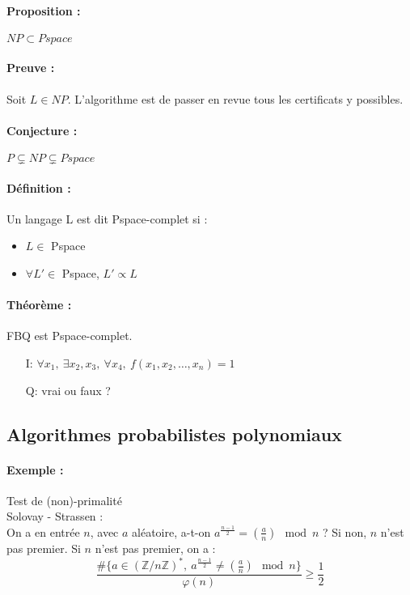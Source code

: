 \documentclass[12pt,a4paper]{report}
\begin{document}
\paragraph{Proposition :} $NP \subset Pspace $
\paragraph{Preuve :\\}
Soit $L \in NP$. L'algorithme est de passer en revue tous les certificats y possibles.

\paragraph{Conjecture :\\}
$ P \subsetneq NP \subsetneq Pspace $

\paragraph{Définition :\\}
Un langage L est dit Pspace-complet si :
\begin{itemize}
\item $L \in $ Pspace 
\item $\forall L' \in$ Pspace, $L' \propto L$
\end{itemize}
\paragraph{Théorème :\\}
FBQ est Pspace-complet.
\begin{itemize}
\item[I:] $\forall x_1,\ \exists x_2, x_3,\ \forall x_4,\ f(x_1,x_2,\ldots,x_n) = 1 $
\item[Q:] vrai ou faux ?
\end{itemize}

\subsection{Algorithmes probabilistes polynomiaux}
\paragraph{Exemple :} Test de (non)-primalité\\
Solovay - Strassen : \\
On a en entrée $n$, avec $a$ aléatoire, a-t-on $a^{\frac{n-1}{2}} = \left(\frac{a}{n}\right) \mod n$ ? Si non, $n$ n'est pas premier.
Si $n$ n'est pas premier, on a :
$$ \frac{\#\{a \in (\mathbb{Z}/n\mathbb{Z})^*,\ a^{\frac{n-1}{2}} \neq \left(\frac{a}{n}\right) \mod n \}}{\varphi(n)} \geqslant \frac{1}{2} $$
\end{document}
